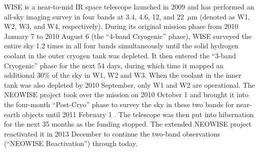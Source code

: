 \documentclass[apj,iop]{emulateapj}
\begin{document}
WISE \citep{Wright2010} is a near-to-mid IR space telescope launched in 2009 and has performed an all-sky imaging survey in four bands at 3.4, 4.6, 12, and 22~$\mu$m (denoted as W1, W2, W3, and W4, respectively). 
During its original mission phase from 2010 January 7 to 2010 August 6 (the “4-band Cryogenic” phase), WISE surveyed the entire sky 1.2 times in all four bands simultaneously until the solid hydrogen coolant in the outer cryogen tank was depleted. It then entered the “3-band Cryogenic” phase for the next 54 days, during which time it mapped an additional 30\% of the sky in W1, W2 and W3. When the coolant in the inner tank was also depleted by 2010 September, only W1 and W2 are operational. The NEOWISE project took over the mission on 2010 October 1 and brought it into the four-month “Post-Cryo” phase to survey the sky in these two bands for near-earth objects until 2011 February 1 \citep[see][]{2014LPI....45.2724M}. The telescope was then put into hibernation for the next 35 months as the funding stopped. The extended NEOWISE project reactivated it in 2013 December to continue the two-band observations (“NEOWISE Reactivation”) through today.
\end{document}
